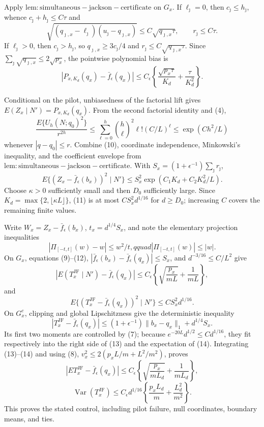 Apply \(\mathrm{lem:simultaneous-jackson-certificate}\) on \(G_x\).  If \(\ell_\jmath=0\), then \(c_\jmath\leq h_\jmath\), whence \(c_\jmath+ h_\jmath\leq C\tau\) and
\[
 \sqrt{(q_{\jmath,x}-\ell_\jmath)(u_\jmath-q_{\jmath,x})}
 \leq C\sqrt{q_{\jmath,x}\tau},\qquad r_\jmath\leq C\tau.
\]
If \(\ell_\jmath>0\), then \(c_\jmath>h_\jmath\), so \(q_{\jmath,x}\geq3c_\jmath/4\) and \(r_\jmath\leq C\sqrt{q_{\jmath,x}\tau}\).  Since \(\sum_\jmath\sqrt{q_{\jmath,x}}\leq2\sqrt{p_x}\), the pointwise polynomial bias is
\[
 |P_{x,K_d}(q_x)-\bar f_\epsilon(q_x)|
 \leq C_\epsilon\left\{\frac{\sqrt{p_x\tau}}{K_d}+\frac{\tau}{K_d^2}\right\}. \tag{9}
\]

Conditional on the pilot, unbiasedness of the factorial lift gives \(E(Z_x\mid N')=P_{x,K_d}(q_x)\).  From the second factorial identity and (4),
\[
 \frac{E\{U_h(N;q_0)^2\}}{r^{2h}}
 \leq\sum_{\ell=0}^h\binom h\ell^2\ell!(C/L)^\ell
 \leq\exp(Ch^2/L)                                                     \tag{10}
\]
whenever \(|q-q_0|\leq r\).  Combine (10), coordinate independence, Minkowski's inequality, and the coefficient envelope from \(\mathrm{lem:simultaneous-jackson-certificate}\).  With \(S_x=(1+\epsilon^{-1})\sum_\jmath r_\jmath\),
\[
 E\{(Z_x-\bar f_\epsilon(b_x))^2\mid N'\}
 \leq S_x^2\exp(C_1K_d+C_2K_d^2/L).                                  \tag{11}
\]
Choose \(\kappa>0\) sufficiently small and then \(D_0\) sufficiently large.  Since \(K_d=\max\{2,\lfloor\kappa L\rfloor\}\), (11) is at most \(C S_x^2d^{1/16}\) for \(d\geq D_0\); increasing \(C\) covers the remaining finite values.

Write \(W_x=Z_x-\bar f_\epsilon(b_x)\), \(t_x=d^{1/4}S_x\), and note the elementary projection inequalities
\[
 |\Pi_{[-t,t]}(w)-w|\leq w^2/t,qquad |\Pi_{[-t,t]}(w)|\leq|w|.       \tag{12}
\]
On \(G_x\), equations (9)--(12), \(|\bar f_\epsilon(b_x)-\bar f_\epsilon(q_x)|\leq S_x\), and \(d^{-3/16}\leq C/L^2\) give
\[
 |E(T_x^{\mathrm{JF}}\mid N')-\bar f_\epsilon(q_x)|
 \leq C_\epsilon\left\{\sqrt{\frac{p_x}{mL}}+\frac1{mL}\right\}, \tag{13}
\]
and
\[
 E\{(T_x^{\mathrm{JF}}-\bar f_\epsilon(q_x))^2\mid N'\}
 \leq C S_x^2d^{1/16}.                                                 \tag{14}
\]
On \(G_x^c\), clipping and global Lipschitzness give the deterministic inequality
\[
 |T_x^{\mathrm{JF}}-\bar f_\epsilon(q_x)|
 \leq(1+\epsilon^{-1})\|b_x-q_x\|_1+d^{1/4}S_x.
\]
Its first two moments are controlled by (7); because \(e^{-20L}d^{1/2}\leq Cd^{1/16}\), they fit respectively into the right side of (13) and the expectation of (14).  Integrating (13)--(14) and using (8), \(v_x^2\leq2(p_xL/m+L^2/m^2)\), proves
\[
 |E T_x^{\mathrm{JF}}-\bar f_\epsilon(q_x)|
 \leq C_\epsilon\left\{\sqrt{\frac{p_x}{mL_d}}+\frac1{mL_d}\right\},
\]
\[
 \operatorname{Var}(T_x^{\mathrm{JF}})
 \leq C_\epsilon d^{1/16}\left\{\frac{p_xL_d}{m}+\frac{L_d^2}{m^2}\right\}.
\]
This proves the stated control, including pilot failure, null coordinates, boundary means, and ties.